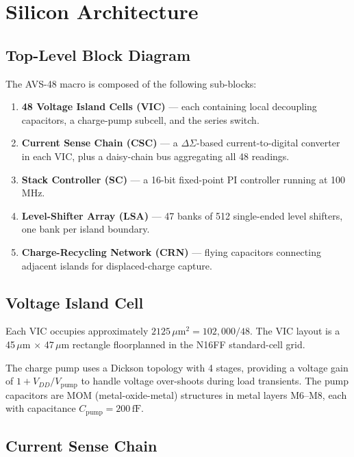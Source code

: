 \section{Silicon Architecture}
\label{sec:silicon}

\subsection{Top-Level Block Diagram}

The AVS-48 macro is composed of the following sub-blocks:
\begin{enumerate}
  \item \textbf{48 Voltage Island Cells (VIC)} — each containing local
        decoupling capacitors, a charge-pump subcell, and the series switch.
  \item \textbf{Current Sense Chain (CSC)} — a $\Delta\Sigma$-based
        current-to-digital converter in each VIC, plus a daisy-chain bus
        aggregating all 48 readings.
  \item \textbf{Stack Controller (SC)} — a 16-bit fixed-point PI controller
        running at 100\,MHz.
  \item \textbf{Level-Shifter Array (LSA)} — 47 banks of 512 single-ended
        level shifters, one bank per island boundary.
  \item \textbf{Charge-Recycling Network (CRN)} — flying capacitors
        connecting adjacent islands for displaced-charge capture.
\end{enumerate}

\subsection{Voltage Island Cell}

Each VIC occupies approximately $2125\,\mu\mathrm{m}^2 = 102{,}000 / 48$.
The VIC layout is a 45\,$\mu$m $\times$ 47\,$\mu$m rectangle floorplanned
in the N16FF standard-cell grid.

The charge pump uses a Dickson topology with 4 stages, providing a
voltage gain of $1 + V_{DD}/V_{\mathrm{pump}}$ to handle voltage
over-shoots during load transients.  The pump capacitors are
MOM (metal-oxide-metal) structures in metal layers M6--M8, each
with capacitance $C_{\mathrm{pump}} = 200\,\mathrm{fF}$.

\subsection{Current Sense Chain}

